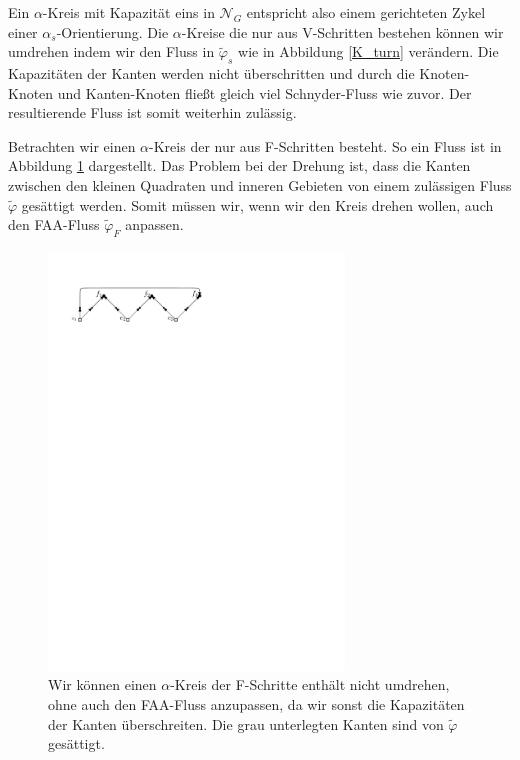 Ein $\alpha$-Kreis mit Kapazität eins in $\mathcal{N}_G$ entspricht also einem gerichteten Zykel einer $\alpha_s$-Orientierung. Die $\alpha$-Kreise die nur aus V-Schritten bestehen können wir umdrehen indem wir den Fluss in $\tilde{\varphi}_s$ wie in Abbildung \ref{K_turn} verändern. Die Kapazitäten der Kanten werden nicht überschritten und durch die Knoten-Knoten und Kanten-Knoten fließt gleich viel Schnyder-Fluss wie zuvor. Der resultierende Fluss ist somit weiterhin zulässig.

Betrachten wir einen $\alpha$-Kreis der nur aus F-Schritten besteht. So ein Fluss ist in Abbildung \ref{G_turn} dargestellt. Das Problem bei der Drehung ist, dass die Kanten zwischen den kleinen Quadraten und inneren Gebieten von einem zulässigen Fluss $\tilde{\varphi}$ gesättigt werden. Somit müssen wir, wenn wir den Kreis drehen wollen, auch den FAA-Fluss $\tilde{\varphi}_F$ anpassen.

\begin{figure}[h]
\centering
\includegraphics[width=0.7\textwidth]{G_kreis.pdf}
\caption{Wir können einen $\alpha$-Kreis der F-Schritte enthält nicht umdrehen, ohne auch den FAA-Fluss anzupassen, da wir sonst die Kapazitäten der Kanten überschreiten. Die grau unterlegten Kanten sind von $\tilde{\varphi}$ gesättigt.}
\label{G_turn}
\end{figure}



